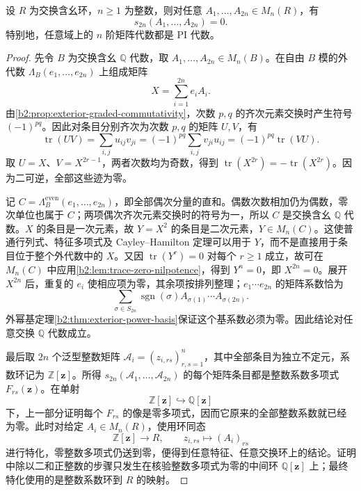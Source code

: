\begin{theorem}\label{b2:thm:amitsur-levitzki}
	设 \(R\) 为交换含幺环，\(n\geq1\) 为整数，则对任意 \(A_1,\ldots,A_{2n}\in M_n(R)\)，有
	\[
		s_{2n}(A_1,\ldots,A_{2n})=0.
	\]
	特别地，任意域上的 \(n\) 阶矩阵代数都是 PI 代数。
\end{theorem}
\begin{proof}
	先令 \(B\) 为交换含幺 \(\mathbb Q\) 代数，取 \(A_1,\ldots,A_{2n}\in M_n(B)\)。在自由 \(B\) 模的外代数 \(\Lambda_B(e_1,\ldots,e_{2n})\) 上组成矩阵
	\[
		X=\sum_{i=1}^{2n}e_iA_i.
	\]
	由\cref{b2:prop:exterior-graded-commutativity}，次数 \(p,q\) 的齐次元素交换时产生符号 \((-1)^{pq}\)。因此对条目分别齐次为次数 \(p,q\) 的矩阵 \(U,V\)，有
	\[
		\operatorname{tr}(UV) =\sum_{i,j}u_{ij}v_{ji} =(-1)^{pq}\sum_{i,j}v_{ji}u_{ij} =(-1)^{pq}\operatorname{tr}(VU).
	\]
	取 \(U=X\)、\(V=X^{2r-1}\)，两者次数均为奇数，得到 \(\operatorname{tr}(X^{2r})=-\operatorname{tr}(X^{2r})\)。因为二可逆，全部这些迹为零。

	记 \(C=\Lambda_B^{\mathrm{even}}(e_1,\ldots,e_{2n})\)，即全部偶次分量的直和。偶数次数相加仍为偶数，零次单位也属于 \(C\)；两项偶次齐次元素交换时的符号为一，所以 \(C\) 是交换含幺 \(\mathbb Q\) 代数。\(X\) 的条目是一次元素，故 \(Y=X^2\) 的条目是二次元素，\(Y\in M_n(C)\)。这使普通行列式、特征多项式及 Cayley–Hamilton 定理可以用于 \(Y\)，而不是直接用于条目位于整个外代数中的 \(X\)。又因 \(\operatorname{tr}(Y^r)=0\) 对每个 \(r\ge1\) 成立，故可在 \(M_n(C)\) 中应用\cref{b2:lem:trace-zero-nilpotence}，得到 \(Y^n=0\)，即 \(X^{2n}=0\)。展开 \(X^{2n}\) 后，重复的 \(e_i\) 使相应项为零，其余项按排列整理；\(e_1\cdots e_{2n}\) 的矩阵系数恰为
	\[
		\sum_{\sigma\in S_{2n}}\operatorname{sgn}(\sigma) A_{\sigma(1)}\cdots A_{\sigma(2n)}.
	\]
	外幂基定理\cref{b2:thm:exterior-power-basis}保证这个基系数必须为零。因此结论对任意交换 \(\mathbb Q\) 代数成立。

	最后取 \(2n\) 个泛型整数矩阵 \(\mathcal A_i=(z_{i,rs})_{r,s=1}^n\)，其中全部条目为独立不定元，系数环记为 \(\mathbb Z[\mathbf z]\)。所得 \(s_{2n}(\mathcal A_1,\ldots,\mathcal A_{2n})\) 的每个矩阵条目都是整数系数多项式 \(F_{rs}(\mathbf z)\)。在单射
	\[
		\mathbb Z[\mathbf z]\hookrightarrow\mathbb Q[\mathbf z]
	\]
	下，上一部分证明每个 \(F_{rs}\) 的像是零多项式，因而它原来的全部整数系数就已经为零。此时对给定 \(A_i\in M_n(R)\)，使用环同态
	\[
		\mathbb Z[\mathbf z]\longrightarrow R,\qquad z_{i,rs}\longmapsto (A_i)_{rs}
	\]
	进行特化，零整数多项式仍送到零，便得到任意特征、任意交换环上的结论。证明中除以二和正整数的步骤只发生在核验整数多项式为零的中间环 \(\mathbb Q[\mathbf z]\) 上；最终特化使用的是整数系数环到 \(R\) 的映射。
\end{proof}

